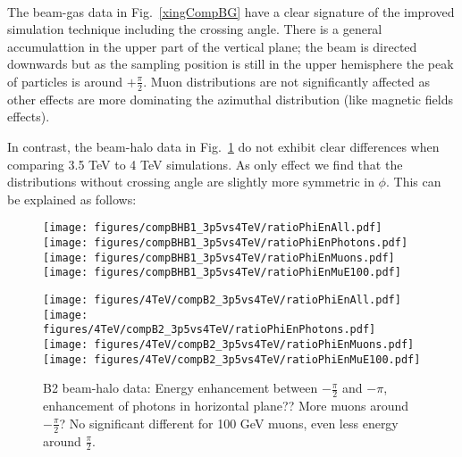 {\\} The beam-gas data in Fig.~\ref{xingCompBG} have a clear signature of the improved simulation technique including the crossing angle. There is a general accumulattion in the upper part of the vertical plane; the beam is directed downwards but as the sampling position is still in the upper hemisphere the peak of particles is around $+ \frac{\pi}{2}$. Muon distributions are not significantly affected as other effects are more dominating the azimuthal distribution (like magnetic fields effects). 

In contrast, the beam-halo data in Fig.~\ref{xingCompBH} do not exhibit clear differences when comparing 3.5 TeV to 4 TeV simulations. As only effect we find that the distributions without crossing angle are slightly more symmetric in $\phi$. This can be explained as follows: 

\begin{figure}
\begin{center}
  \texttt{[image: figures/compBHB1\_3p5vs4TeV/ratioPhiEnAll.pdf]}
  \texttt{[image: figures/compBHB1\_3p5vs4TeV/ratioPhiEnPhotons.pdf]}
  \texttt{[image: figures/compBHB1\_3p5vs4TeV/ratioPhiEnMuons.pdf]}
  \texttt{[image: figures/compBHB1\_3p5vs4TeV/ratioPhiEnMuE100.pdf]}

  \texttt{[image: figures/4TeV/compB2\_3p5vs4TeV/ratioPhiEnAll.pdf]}
  \texttt{[image: figures/4TeV/compB2\_3p5vs4TeV/ratioPhiEnPhotons.pdf]}
  \texttt{[image: figures/4TeV/compB2\_3p5vs4TeV/ratioPhiEnMuons.pdf]}
  \texttt{[image: figures/4TeV/compB2\_3p5vs4TeV/ratioPhiEnMuE100.pdf]}
\end{center}
\vspace{-0.6cm}
 \caption{B2 beam-halo data: Energy enhancement between $-\frac{\pi}{2}$ and $-\pi$, enhancement of photons in horizontal plane?? More muons around $-\frac{\pi}{2}$? No significant different for 100 GeV muons, even less energy around $\frac{\pi}{2}$.
  \label{xingCompBH}}
\end{figure}

